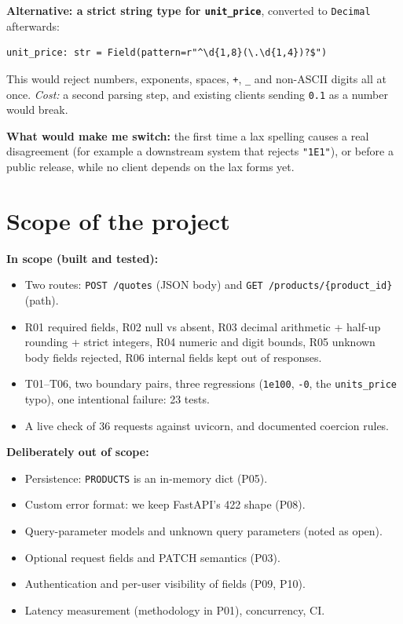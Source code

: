 \documentclass[11pt,a4paper]{article}
\newcommand{\code}[1]{\texttt{#1}}
\begin{document}
\textbf{Alternative: a strict string type for \code{unit\_price}}, converted to
\code{Decimal} afterwards:

\begin{Verbatim}[fontsize=\small, frame=single, framesep=2mm]
unit_price: str = Field(pattern=r"^\d{1,8}(\.\d{1,4})?$")
\end{Verbatim}
 This would reject numbers, exponents, spaces,
\code{+}, \code{\_} and non-ASCII digits all at once. \emph{Cost:} a second
parsing step, and existing clients sending \code{0.1} as a number would break.

\textbf{What would make me switch:} the first time a lax spelling causes a real
disagreement (for example a downstream system that rejects \code{"1E1"}), or before a
public release, while no client depends on the lax forms yet.

\section{Scope of the project}

\textbf{In scope (built and tested):}
\begin{itemize}
  \item Two routes: \code{POST /quotes} (JSON body) and \code{GET /products/\{product\_id\}} (path).
  \item R01 required fields, R02 null vs absent, R03 decimal arithmetic + half-up
  rounding + strict integers, R04 numeric and digit bounds, R05 unknown body fields
  rejected, R06 internal fields kept out of responses.
  \item T01--T06, two boundary pairs, three regressions (\code{1e100}, \code{-0}, the
  \code{units\_price} typo), one intentional failure: 23 tests.
  \item A live check of 36 requests against uvicorn, and documented coercion rules.
\end{itemize}

\textbf{Deliberately out of scope:}
\begin{itemize}
  \item Persistence: \code{PRODUCTS} is an in-memory dict (P05).
  \item Custom error format: we keep FastAPI's 422 shape (P08).
  \item Query-parameter models and unknown query parameters (noted as open).
  \item Optional request fields and PATCH semantics (P03).
  \item Authentication and per-user visibility of fields (P09, P10).
  \item Latency measurement (methodology in P01), concurrency, CI.
\end{itemize}
\end{document}
